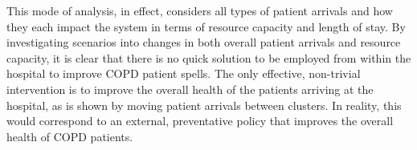 This mode of analysis, in effect, considers all types of patient arrivals and
how they each impact the system in terms of resource capacity and length of
stay. By investigating scenarios into changes in both overall patient arrivals
and resource capacity, it is clear that there is no quick solution to be
employed from within the hospital to improve COPD patient spells. The only
effective, non-trivial intervention is to improve the overall health of the
patients arriving at the hospital, as is shown by moving patient arrivals
between clusters. In reality, this would correspond to an external, preventative
policy that improves the overall health of COPD patients.
